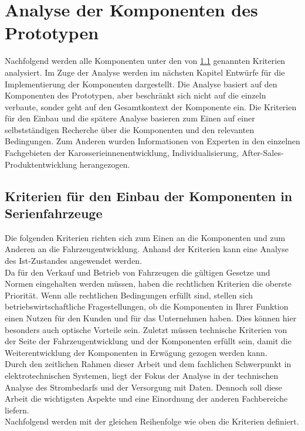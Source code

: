 \chapter{Analyse der Komponenten des Prototypen}
\label{cha:Analyse}
Nachfolgend werden alle Komponenten unter den von \ref{cha:Kriterien} genannten Kriterien analysiert. Im Zuge der Analyse werden im nächsten Kapitel Entwürfe für die Implementierung der Komponenten dargestellt. Die Analyse basiert auf den Komponenten des Prototypen, aber beschränkt sich nicht auf die einzeln verbaute, sonder geht auf den Gesamtkontext der Komponente ein.
Die Kriterien für den Einbau und die spätere Analyse basieren zum Einen auf einer selbstständigen Recherche über die Komponenten und den relevanten Bedingungen. Zum Anderen wurden Informationen von Experten in den einzelnen Fachgebieten der Karosserieinnenentwicklung, Individualisierung, After-Sales-Produktentwicklung herangezogen.
\section{Kriterien für den Einbau der Komponenten in Serienfahrzeuge}
\label{cha:Kriterien}
Die folgenden Kriterien richten sich zum Einen an die Komponenten und zum Anderen an die Fahrzeugentwicklung. Anhand der Kriterien kann eine Analyse des Ist-Zustandes angewendet werden.\\
Da für den Verkauf und Betrieb von Fahrzeugen die gültigen Gesetze und Normen eingehalten werden müssen, haben die rechtlichen Kriterien die oberste Priorität. Wenn alle rechtlichen Bedingungen erfüllt sind, stellen sich betriebswirtschaftliche Fragestellungen, ob die Komponenten in Ihrer Funktion einen Nutzen für den Kunden und für das Unternehmen haben. Dies können hier besonders auch optische Vorteile sein. Zuletzt müssen technische Kriterien von der Seite der Fahrzeugentwicklung und der Komponenten erfüllt sein, damit die Weiterentwicklung der Komponenten in Erwägung gezogen werden kann. \\
Durch den zeitlichen Rahmen dieser Arbeit und dem fachlichen Schwerpunkt in elektrotechnischen Systemen, liegt der Fokus der Analyse in der technischen Analyse des Strombedarfs und der Versorgung mit Daten. Dennoch soll diese Arbeit die wichtigsten Aspekte und eine Einordnung der anderen Fachbereiche liefern.\\
Nachfolgend werden mit der gleichen Reihenfolge wie oben die Kriterien definiert.

